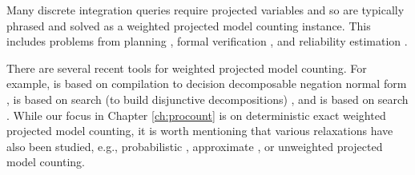 Many discrete integration queries require projected variables and so are typically phrased and solved as a weighted projected model counting instance. 
This includes problems from planning \cite{aziz2015projected}, formal verification \cite{klebanov2013sat}, and reliability estimation \cite{duenas2017counting}. 

There are several recent tools for weighted projected model counting.
For example, \dfp{} is based on compilation to decision decomposable negation normal form \cite{lagniez2019recursive}, \projmc{} is based on search (to build disjunctive decompositions) \cite{lagniez2019recursive}, and \ssat{} is based on search \cite{lee2017solving}. 
While our focus in Chapter \ref{ch:procount} is on deterministic exact weighted projected model counting, it is worth mentioning that various relaxations have also been studied, e.g., probabilistic \cite{sharma2019ganak}, approximate \cite{ermon2013taming,fremont2017maximum,soos2019bird}, or unweighted \cite{zawadzki2013generalization,aziz2015projected,mohle2018dualizing,hecher2020taming} projected model counting.
